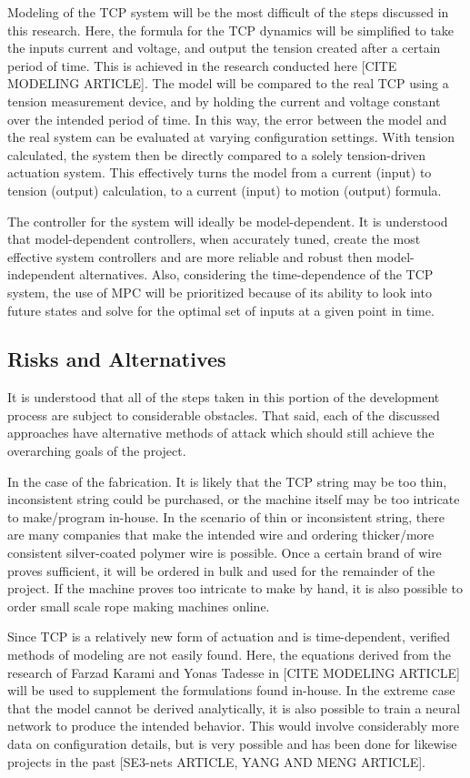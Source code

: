 Modeling of the TCP system will be the most difficult of the steps discussed in this research. Here, the formula for the TCP dynamics will be simplified to take the inputs current and voltage, and output the tension created after a certain period of time. This is achieved in the research conducted here [CITE MODELING ARTICLE]. The model will be compared to the real TCP using a tension measurement device, and by holding the current and voltage constant over the intended period of time. In this way, the error between the model and the real system can be evaluated at varying configuration settings. With tension calculated, the system then be directly compared to a solely tension-driven actuation system. This effectively turns the model from a current (input) to tension (output) calculation, to a current (input) to motion (output) formula.

The controller for the system will ideally be model-dependent. It is understood that model-dependent controllers, when accurately tuned, create the most effective system controllers and are more reliable and robust then model-independent alternatives. Also, considering the time-dependence of the TCP system, the use of MPC will be prioritized because of its ability to look into future states and solve for the optimal set of inputs at a given point in time.

\subsection{Risks and Alternatives}

It is understood that all of the steps taken in this portion of the development process are subject to considerable obstacles. That said, each of the discussed approaches have alternative methods of attack which should still achieve the overarching goals of the project.

In the case of the fabrication. It is likely that the TCP string may be too thin, inconsistent string could be purchased, or the machine itself may be too intricate to make/program in-house. In the scenario of thin or inconsistent string, there are many companies that make the intended wire and ordering thicker/more consistent silver-coated polymer wire is possible. Once a certain brand of wire proves sufficient, it will be ordered in bulk and used for the remainder of the project. If the machine proves too intricate to make by hand, it is also possible to order small scale rope making machines online.

Since TCP is a relatively new form of actuation and is time-dependent, verified methods of modeling are not easily found. Here, the equations derived from the research of Farzad Karami and Yonas Tadesse in [CITE MODELING ARTICLE] will be used to supplement the formulations found in-house. In the extreme case that the model cannot be derived analytically, it is also possible to train a neural network to produce the intended behavior. This would involve considerably more data on configuration details, but is very possible and has been done for likewise projects in the past [SE3-nets ARTICLE, YANG AND MENG ARTICLE].

